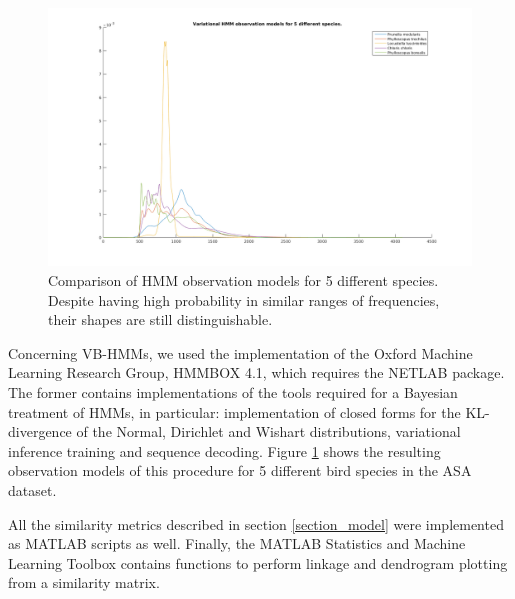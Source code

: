 \documentclass[pdftex,11pt,a4paper]{article}
\theoremstyle{definition}
\theoremstyle{remark}
\newcommand*{\V}[1]{\mathbf{#1}}%
\begin{document}
\begin{figure}[t]
\centering
\includegraphics[width=\textwidth]{images/gmm_plots}
\caption{Comparison of HMM observation models for 5 different species. Despite having high probability in similar ranges of frequencies, their shapes are still distinguishable. }
\label{fig_kdespecies}
\end{figure}
\par Concerning VB-HMMs, we used the implementation of the Oxford Machine Learning Research Group, HMMBOX 4.1, which requires the NETLAB package. The former contains implementations of the tools required for a Bayesian treatment of HMMs, in particular: implementation of closed forms for the KL-divergence of the Normal, Dirichlet and Wishart distributions, variational inference training and sequence decoding. Figure \ref{fig_kdespecies} shows the resulting observation models of this procedure for 5 different bird species in the ASA dataset. %
\par All the similarity metrics described in section \ref{section_model} were implemented as MATLAB scripts as well. Finally, the MATLAB Statistics and Machine Learning Toolbox contains functions to perform linkage and dendrogram plotting from a similarity matrix.
\end{document}
